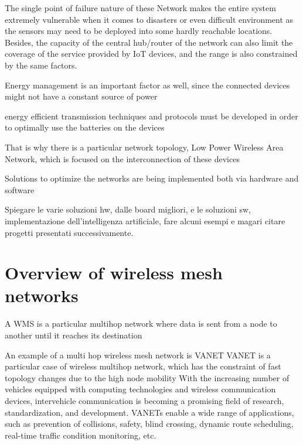 		The  single  point  of  failure  nature  of  these  
		Network makes the entire system extremely vulnerable when it 
		comes to disasters or even difficult environment as the sensors 
		may need to be deployed into some hardly reachable locations.
		Besides,  the  capacity  of  the  central  hub/router  of  the  network  
		can  also  limit  the  coverage  of  the  service  provided  by  IoT  
		devices,  and the range is  also constrained by  the  same  factors.
	
		Energy management is an important factor as well, since the connected devices might not have a constant source of power
		
		energy efficient transmission techniques and protocols must be developed in order to optimally use the batteries on the devices
		
		
		That is why there is a particular network topology, Low Power Wireless Area Network, which is focused on the interconnection of these devices
	
		
		Solutions to optimize the networks are being implemented both via hardware and software
		
		Spiegare le varie soluzioni hw, dalle board migliori, e le soluzioni sw, implementazione dell'intelligenza artificiale, fare alcuni esempi e magari citare progetti presentati successivamente.
	
	\section{Overview of wireless mesh networks}
	
		A WMS is a particular multihop network where data is sent from a node to another until it reaches its destination
		
		An example of a multi hop wireless mesh network is VANET
		VANET is a particular case of wireless multihop network, which has the constraint of fast topology changes due to the high node mobility With the increasing number of vehicles equipped with computing technologies and wireless communication devices, intervehicle communication is becoming a promising field of research, standardization, and development. VANETs enable a wide range of applications, such as prevention of collisions, safety, blind crossing, dynamic route scheduling, real-time traffic condition monitoring, etc.
		\cite{BADIS2015653}
		
